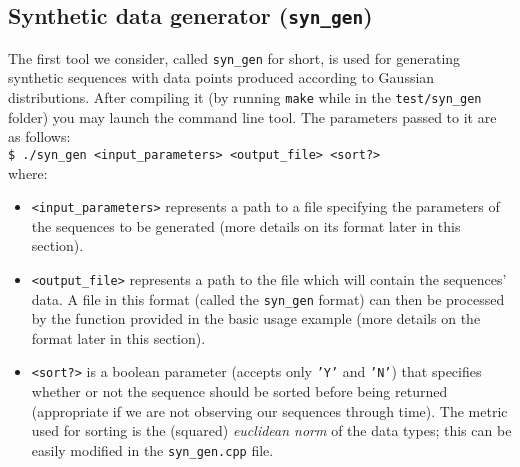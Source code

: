 \documentclass[12pt,openany]{article}
\newcommand{\shellcmd}[1]{\\\indent\indent\texttt{\footnotesize\$ #1}}
\begin{document}
	\subsection{Synthetic data generator ({\tt syn\_gen})}
	The first tool we consider, called {\tt syn\_gen} for short, is used for generating synthetic sequences with data points produced according to Gaussian distributions. After compiling it (by running {\tt make} while in the {\tt test/syn\_gen} folder) you may launch the command line tool. The parameters passed to it are as follows:
	\shellcmd{./syn\_gen <input\_parameters> <output\_file> <sort?\! [Y/N]>}\\
	where:
	\begin{itemize}
		\item {\tt <input\_parameters>} represents a path to a file specifying the parameters of the sequences to be generated (more details on its format later in this section).
		\item {\tt <output\_file>} represents a path to the file which will contain the sequences' data. A file in this format (called the {\tt syn\_gen} format) can then be processed by the function provided in the basic usage example (more details on the format later in this section).
		\item {\tt <sort?>} is a boolean parameter (accepts only {\tt 'Y'} and {\tt 'N'}) that specifies whether or not the sequence should be sorted before being returned (appropriate if we are not observing our sequences through time). The metric used for sorting is the (squared) \emph{euclidean norm} of the data types; this can be easily modified in the {\tt syn\_gen.cpp} file.
	\end{itemize} 
\end{document}
